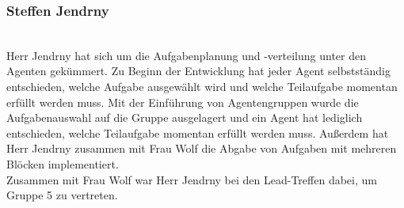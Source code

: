 \subsubsection{Steffen Jendrny} ~\\
Herr Jendrny hat sich um die Aufgabenplanung und -verteilung unter den Agenten gekümmert. Zu Beginn der Entwicklung hat jeder Agent selbstständig entschieden, welche Aufgabe ausgewählt wird und welche Teilaufgabe momentan erfüllt werden muss. Mit der Einführung von Agentengruppen wurde die Aufgabenauswahl auf die Gruppe ausgelagert und ein Agent hat lediglich entschieden, welche Teilaufgabe momentan erfüllt werden muss. Außerdem hat Herr Jendrny zusammen mit Frau Wolf die Abgabe von Aufgaben mit mehreren Blöcken implementiert. \\
Zusammen mit Frau Wolf war Herr Jendrny bei den Lead-Treffen dabei, um Gruppe 5 zu vertreten.